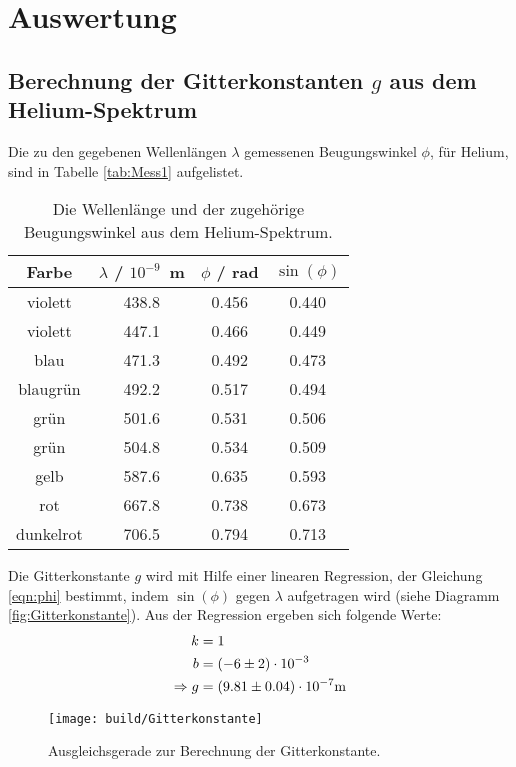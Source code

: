 \section{Auswertung}
\label{sec:Auswertung}

\subsection{Berechnung der Gitterkonstanten $g$ aus dem Helium-Spektrum}
Die zu den gegebenen Wellenlängen $\lambda$ gemessenen Beugungswinkel $\phi$, für Helium, sind in Tabelle \eqref{tab:Mess1} aufgelistet.

\begin{table}[H] %
  \centering
  \begin{tabular}{c| c c c}
    \toprule
    Farbe & $\lambda$ / $10^{-9}$\, m & $\phi$ / rad & $\sin(\phi)$ \\
    \midrule
      violett   & 438.8 & 0.456 & 0.440 \\
      violett   & 447.1 & 0.466 & 0.449 \\
      blau      & 471.3 & 0.492 & 0.473 \\
      blaugrün  & 492.2 & 0.517 & 0.494 \\
      grün      & 501.6 & 0.531 & 0.506 \\
      grün      & 504.8 & 0.534 & 0.509 \\
      gelb      & 587.6 & 0.635 & 0.593 \\
      rot       & 667.8 & 0.738 & 0.673 \\
      dunkelrot & 706.5 & 0.794 & 0.713 \\
    \bottomrule
  \end{tabular}
  \caption{Die Wellenlänge und der zugehörige Beugungswinkel aus dem Helium-Spektrum.}
  \label{tab:Mess1}
\end{table}

Die Gitterkonstante $g$ wird mit Hilfe einer linearen Regression, der Gleichung \eqref{eqn:phi} bestimmt, indem $\sin(\phi)$ gegen $\lambda$ aufgetragen wird (siehe Diagramm \eqref{fig:Gitterkonstante}). Aus der Regression ergeben sich folgende Werte:
\begin{align*}
  k & = 1 \\
  b & = (\num{-6 +- 2}) \cdot 10^{-3} \\
  \Rightarrow g & = (\num{9.81 +- 0.04}) \cdot 10^{-7} \text{m}
\end{align*}

\begin{figure}[H]
  \centering
  \texttt{[image: build/Gitterkonstante]}
  \caption{Ausgleichsgerade zur Berechnung der Gitterkonstante.}
  \label{fig:Gitterkonstante}
\end{figure}

